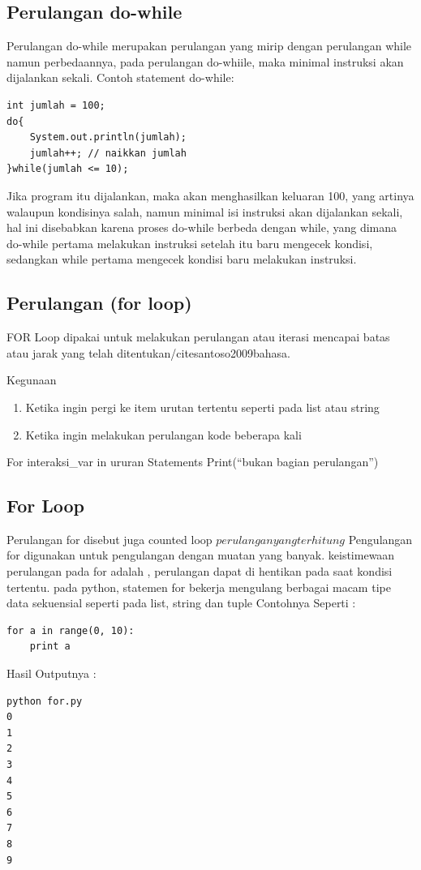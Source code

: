 \subsection{Perulangan do-while}
Perulangan do-while merupakan perulangan yang  mirip dengan perulangan while namun perbedaannya\cite{arfian2012rekayasa}, pada perulangan do-whiile, maka minimal instruksi akan dijalankan sekali. Contoh statement do-while:
\begin{verbatim}
int jumlah = 100;
do{
    System.out.println(jumlah);
    jumlah++; // naikkan jumlah
}while(jumlah <= 10);
\end{verbatim}
Jika program itu dijalankan, maka akan menghasilkan keluaran 100,  yang artinya walaupun kondisinya salah, namun minimal isi instruksi akan dijalankan sekali, hal ini disebabkan karena proses do-while berbeda dengan while,  yang dimana do-while pertama melakukan instruksi setelah itu baru mengecek kondisi, sedangkan while pertama mengecek kondisi baru melakukan instruksi. 

\subsection{Perulangan (for loop)}
FOR Loop dipakai untuk melakukan perulangan atau iterasi mencapai batas atau jarak yang telah ditentukan/cite{santoso2009bahasa}.

Kegunaan
\begin{enumerate}
\item Ketika ingin pergi ke item urutan tertentu seperti pada list atau string
\item Ketika ingin melakukan perulangan kode beberapa kali
\end{enumerate}
For interaksi\_var in ururan
Statements
Print(“bukan bagian perulangan”) 

\subsection{For Loop}
Perulangan for disebut juga counted loop \(perulangan yang terhitung\)
Pengulangan for digunakan untuk pengulangan dengan muatan yang banyak\cite{van2007python}.
keistimewaan perulangan pada for adalah , perulangan dapat di hentikan pada saat kondisi tertentu. pada python, statemen for bekerja mengulang berbagai macam tipe data sekuensial seperti pada list, string dan tuple
Contohnya Seperti :
\begin{verbatim}
for a in range(0, 10):
	print a
\end{verbatim}
Hasil Outputnya :
\begin{verbatim}
python for.py
0
1
2
3
4
5
6
7
8
9
\end{verbatim}


